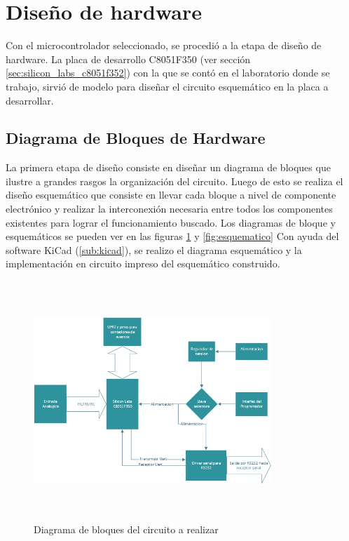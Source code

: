 \documentclass{article}
\theoremstyle{definition}
\theoremstyle{remark}
\begin{document}




\section{Diseño de hardware} %
\label{sec:diseno_de_hardware}




Con el microcontrolador seleccionado, se procedió a la etapa de diseño de hardware. La placa de desarrollo C8051F350 (ver sección \ref{sec:silicon_labs_c8051f352}) con la que se contó en el laboratorio donde se trabajo, sirvió de modelo para diseñar el circuito esquemático en la placa a desarrollar.

\subsection{Diagrama de Bloques de Hardware} %
\label{sub:diagrama_de_bloques_de_hardware}

La primera etapa de diseño consiste en diseñar un diagrama de bloques que ilustre a grandes rasgos la organización del circuito. Luego de esto se realiza el diseño esquemático que consiste en llevar cada bloque a nivel de componente electrónico y realizar la interconexión necesaria entre todos los componentes existentes para lograr el funcionamiento buscado. Los diagramas de bloque y esquemáticos se pueden ver en las figuras \ref{fig:bloquesHW} y \ref{fig:esquematico} Con ayuda del software KiCad (\ref{sub:kicad}), se realizo el diagrama esquemático y la implementación en circuito impreso del esquemático construido.

\begin{figure}[h]
  \centering
  \includegraphics[width=0.80\textwidth, height = 9cm]{bloquesHW}
  \caption{\small Diagrama de bloques del circuito a realizar}\label{fig:bloquesHW}
\end{figure}
\end{document}
